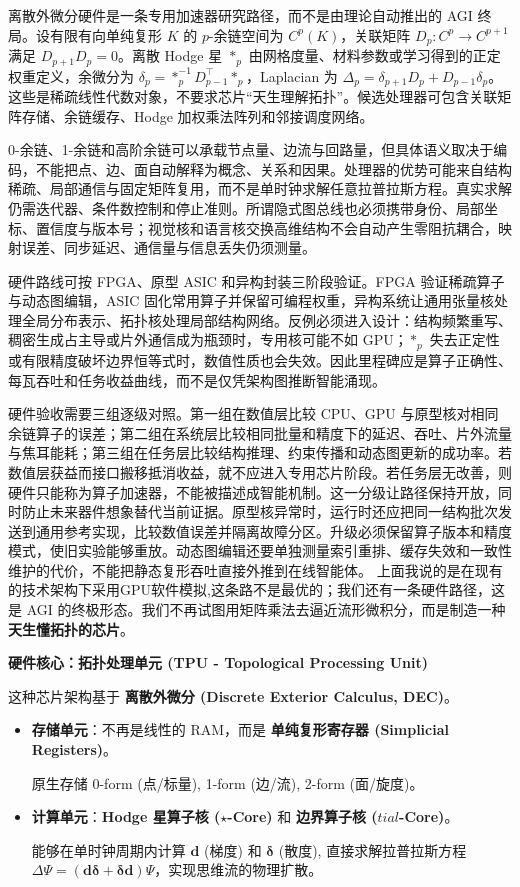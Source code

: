 离散外微分硬件是一条专用加速器研究路径，而不是由理论自动推出的 AGI 终局。设有限有向单纯复形 $K$ 的 $p$-余链空间为 $C^p(K)$，关联矩阵 $D_p:C^p\to C^{p+1}$ 满足 $D_{p+1}D_p=0$。离散 Hodge 星 $*_p$ 由网格度量、材料参数或学习得到的正定权重定义，余微分为 $\delta_p=*_p^{-1}D_{p-1}^{\top}*_p$，Laplacian 为 $\Delta_p=\delta_{p+1}D_p+D_{p-1}\delta_p$。这些是稀疏线性代数对象，不要求芯片“天生理解拓扑”。候选处理器可包含关联矩阵存储、余链缓存、Hodge 加权乘法阵列和邻接调度网络。

0-余链、1-余链和高阶余链可以承载节点量、边流与回路量，但具体语义取决于编码，不能把点、边、面自动解释为概念、关系和因果。处理器的优势可能来自结构稀疏、局部通信与固定矩阵复用，而不是单时钟求解任意拉普拉斯方程。真实求解仍需迭代器、条件数控制和停止准则。所谓隐式图总线也必须携带身份、局部坐标、置信度与版本号；视觉核和语言核交换高维结构不会自动产生零阻抗耦合，映射误差、同步延迟、通信量与信息丢失仍须测量。

硬件路线可按 FPGA、原型 ASIC 和异构封装三阶段验证。FPGA 验证稀疏算子与动态图编辑，ASIC 固化常用算子并保留可编程权重，异构系统让通用张量核处理全局分布表示、拓扑核处理局部结构网络。反例必须进入设计：结构频繁重写、稠密生成占主导或片外通信成为瓶颈时，专用核可能不如 GPU；$*_p$ 失去正定性或有限精度破坏边界恒等式时，数值性质也会失效。因此里程碑应是算子正确性、每瓦吞吐和任务收益曲线，而不是仅凭架构图推断智能涌现。

硬件验收需要三组逐级对照。第一组在数值层比较 CPU、GPU 与原型核对相同余链算子的误差；第二组在系统层比较相同批量和精度下的延迟、吞吐、片外流量与焦耳能耗；第三组在任务层比较结构推理、约束传播和动态图更新的成功率。若数值层获益而接口搬移抵消收益，就不应进入专用芯片阶段。若任务层无改善，则硬件只能称为算子加速器，不能被描述成智能机制。这一分级让路径保持开放，同时防止未来器件想象替代当前证据。原型核异常时，运行时还应把同一结构批次发送到通用参考实现，比较数值误差并隔离故障分区。升级必须保留算子版本和精度模式，使旧实验能够重放。动态图编辑还要单独测量索引重排、缓存失效和一致性维护的代价，不能把静态复形吞吐直接外推到在线智能体。
上面我说的是在现有的技术架构下采用GPU软件模拟,这条路不是最优的；我们还有一条硬件路径，这是 AGI 的终极形态。我们不再试图用矩阵乘法去逼近流形微积分，而是制造一种 \textbf{天生懂拓扑的芯片}。

\textbf{硬件核心：拓扑处理单元 (TPU - Topological Processing Unit)}

这种芯片架构基于 \textbf{离散外微分 (Discrete Exterior Calculus, DEC)}。

\begin{itemize}
    \item   \textbf{存储单元}：不再是线性的 RAM，而是 \textbf{单纯复形寄存器 (Simplicial Registers)}。

        原生存储 0-form (点/标量), 1-form (边/流), 2-form (面/旋度)。

    \item   \textbf{计算单元}：\textbf{Hodge 星算子核 ($\star$-Core)} 和 \textbf{边界算子核 ($tial$-Core)}。

        能够在单时钟周期内计算 $\mathbf{d}$ (梯度) 和 $\mathbf{\delta}$ (散度), 直接求解拉普拉斯方程 $\Delta \Psi = (\mathbf{d}\mathbf{\delta} + \mathbf{\delta}\mathbf{d})\Psi$，实现思维流的物理扩散。
\end{itemize}



